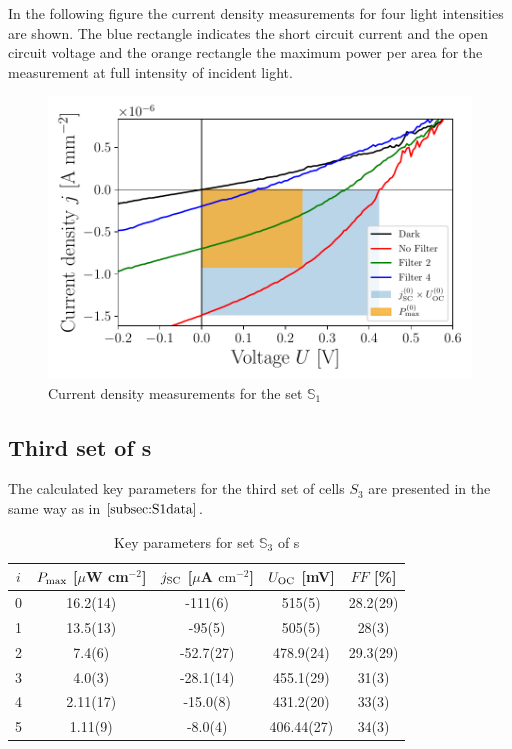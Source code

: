 \documentclass[a4paper,10pt,twocolumn]{article}
\begin{document}
\begin{extract*}
In the following figure the current density measurements for four light intensities are shown. The blue rectangle indicates the short circuit current and the open circuit voltage and the orange rectangle the maximum power per area for the measurement at full intensity of incident light.

\begin{figure}[h]\centering
	\includegraphics[width=\columnwidth]{../../../IV-Curve-Analysis/OSC1Graph.pdf}
	\caption{Current density measurements for the set $\mathbb{S}_1$}
	\label{fig:OSC1Graph}
\end{figure}

\subsection{Third set of \BHSC s}

The calculated key parameters for the third set of cells $S_3$ are presented in the same way as in $\ref{subsec:S1data}$.

\begin{table}[h]\centering
	\caption{Key parameters for set $\mathbb{S}_3$ of \BHSC s}
	\label{tab:keyparams3}
	\begin{tabular}{@{}ccccc@{}}\toprule
		$i$ & $P_{\text{max}}$ [$\mu$W cm$^{-2}$] & $j_{\text{SC}}$ [$\mu$A $\mathrm{cm}^{-2}$] & $U_{\text{OC}}$ [mV] & $FF$ [\%]\\\midrule
		0 &   16.2(14)  &  -111(6)  & 515(5) & 28.2(29) \\
		1 &   13.5(13)  &  -95(5)  & 505(5) & 28(3) \\
		2 &   7.4(6)  &  -52.7(27)  & 478.9(24) & 29.3(29) \\
		3 &   4.0(3)  &  -28.1(14)  & 455.1(29) & 31(3) \\
		4 &   2.11(17)  &  -15.0(8)  & 431.2(20) & 33(3)\\
		5 &  1.11(9)  &  -8.0(4)  & 406.44(27) & 34(3) \\\bottomrule
	\end{tabular}
\end{table}


\end{extract*}
\end{document}
